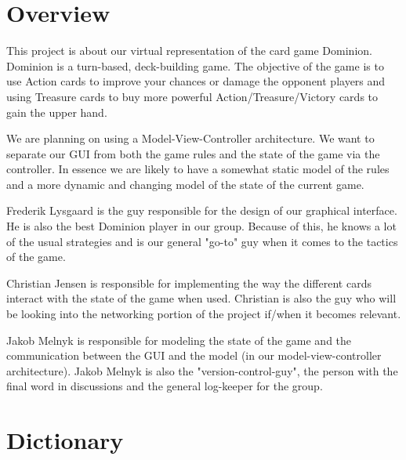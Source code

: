 \documentclass[12pt,a4paper,notitlepage]{article}
\begin{document}
\section{Overview}
This project is about our virtual representation of the card game Dominion. Dominion is a turn-based, deck-building game. The objective of the game is to use Action cards to improve your chances or damage the opponent players and using Treasure cards to buy more powerful Action/Treasure/Victory cards to gain the upper hand. 

We are planning on using a Model-View-Controller architecture. We want to separate our GUI from both the game rules and the state of the game via the controller. In essence we are likely to have a somewhat static model of the rules and a more dynamic and changing model of the state of the current game.

Frederik Lysgaard is the guy responsible for the design of our graphical interface. He is also the best Dominion player in our group. Because of this, he knows a lot of the usual strategies and is our general "go-to" guy when it comes to the tactics of the game.

Christian Jensen is responsible for implementing the way the different cards interact with the state of the game when used. Christian is also the guy who will be looking into the networking portion of the project if/when it becomes relevant.

Jakob Melnyk is responsible for modeling the state of the game and the communication between the GUI and the model (in our model-view-controller architecture). Jakob  Melnyk is also the "version-control-guy", the person with the final word in discussions and the general log-keeper for the group.
\pagebreak
\section{Dictionary}
\end{document}
